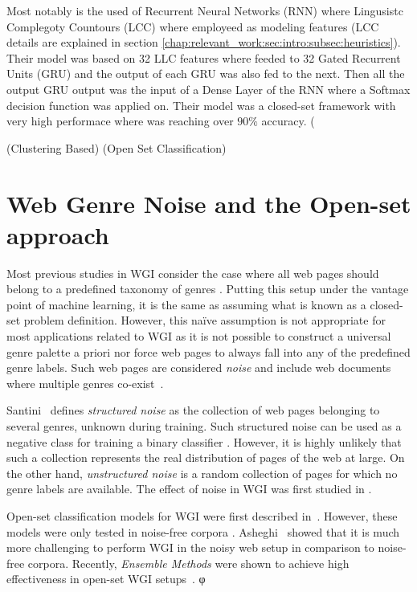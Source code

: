 Most notably is the used of Recurrent Neural Networks (RNN) where Lingusistc Complegoty Countours (LCC) where employeed as modeling features (LCC details are explained in section \ref{chap:relevant_work:sec:intro:subsec:heuristics}). Their model was based on 32 LLC features where feeded to 32 Gated Recurrent Units (GRU)  and the output of each GRU was also fed to the next. Then all the output GRU output was the input of a Dense Layer of the RNN where a Softmax decision function was applied on. Their model was a closed-set framework with very high performace where was reaching over $90\%$  accuracy. (\parencite{strobel2018text}

(Clustering Based)
(Open Set Classification)

\section{Web Genre Noise and the Open-set approach}\label{chap:relevant_work:sec:intro}
Most previous studies in WGI consider the case where all web pages should belong to a predefined taxonomy of genres \cite{Lim2005,santini2007automatic,kanaris2009learning,jebari2014pure_URL}. Putting this setup under the vantage point of machine learning, it is the same as assuming what is known as a closed-set problem definition. However, this naïve assumption is not appropriate for most applications related to WGI as it is not possible to construct a universal genre palette a priori nor force web pages to always fall into any of the predefined genre labels. Such web pages are considered \textit{noise} and include web documents where multiple genres co-exist~\cite{santini2011cross,levering2008using}. 

Santini~\cite{santini2011cross} defines \textit{structured noise} as the collection of web pages belonging to several genres, unknown during training. Such structured noise can be used as a negative class for training a binary classifier \cite{Vidulin2007}. However, it is highly unlikely that such a collection represents the real distribution of pages of the web at large. On the other hand, \textit{unstructured noise} is a random collection of pages \cite{santini2011cross} for which no genre labels are available. The effect of noise in WGI was first studied in \cite{shepherd2004cybergenre,kennedy2005automatic,dong2006binary,levering2008using}.

Open-set classification models for WGI were first
described in~\cite{pritsos2013open,stubbe2007genre}. However, these models were only tested in noise-free corpora \cite{pritsos2015clef}. Asheghi~\cite{Asheghi2015} showed that it is much more challenging to perform WGI
in the noisy web setup in comparison to noise-free corpora. Recently, \textit{Ensemble Methods} were shown to achieve high effectiveness in open-set WGI setups~\cite{pritsos2018open}.
φ


